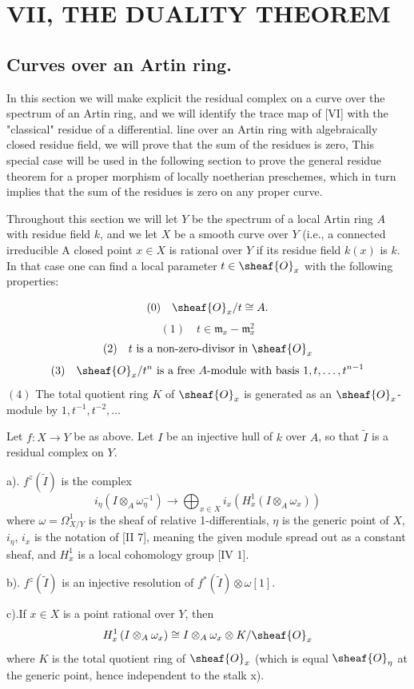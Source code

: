 \documentclass[12pt]{book}
\begin{document}
\setcounter{page}{357}
\chapter{VII, THE DUALITY THEOREM}

\section{Curves over an Artin ring.}

In this section we will make explicit the residual complex on a curve over the spectrum of an Artin ring, and we will identify the trace map of [VI] with the "classical" residue of a differential.
line over an Artin ring with algebraically closed residue field, we will prove that the sum of the residues is zero, This special case will be used in the following section to prove the general residue theorem for a proper morphism of locally noetherian preschemes, which in turn implies that the sum of the residues is zero on any proper curve.

Throughout this section we will let \(Y\) be the spectrum of a local Artin ring \(A\) with residue field \(k\), and we let \(X\) be a smooth curve over \(Y\) (i.e., a connected irreducible A closed point \(x \in X\) is rational over \(Y\) if its residue field \(k(x)\) is \(k\).
In that case one can find a local parameter \(t \in \sheaf{O}_{x}\) with the following properties:

\setcounter{page}{358}
\[
(0)\quad \sheaf{O}_{x} / t \cong A.
\]
\[
(1)\quad t \in \mathfrak{m}_{x}-\mathfrak{m}_{x}^{2}
\]
\[
(2)\quad t \text{ is a non-zero-divisor in } \sheaf{O}_{x}
\]
\[
(3)\quad \sheaf{O}_{x} / t^{n} \text{ is a free } A\text{-module with basis } 1, t, \dots, t^{n-1}
\]
\((4)\) The total quotient ring \(K\) of \(\sheaf{O}_{x}\) is generated as an \(\sheaf{O}_{x}\)-module by \(1, t^{-1}, t^{-2}, \dots\)

\begin{proposition}
Let \(f: X \to Y\) be as above.
Let \(I\) be an injective hull of \(k\) over \(A\), so that \(\tilde{I}\) is a residual complex on \(Y\).

a). \(f^{z}(\tilde{I})\) is the complex
\[
i_{\eta}\left(I \otimes_{A} \omega_{\eta}^{-1}\right) \to \bigoplus_{x \in X} i_{x}\left(H_{x}^{1}\left(I \otimes_{A} \omega_{x}\right)\right)
\]
where \(\omega=\Omega_{X/Y}^{1}\) is the sheaf of relative 1-differentials, \(\eta\) is the generic point of \(X\), \(i_{\eta}\), \(i_{x}\) is the notation of [II 7], meaning the given module spread out as a constant sheaf, and \(H_{x}^{1}\) is a local cohomology group [IV 1].

\setcounter{page}{359}
b). \(f^{z}(\tilde{I})\) is an injective resolution of \(f^{*}(\tilde{I}) \otimes \omega[1]\).

c).If \(x \in X\) is a point rational over \(Y\), then
\[
H_{x}^{1}\left(I \otimes_{A} \omega_{x}\right) \cong I \otimes_{A} \omega_{x} \otimes K / \sheaf{O}_{x}
\]
where \(K\) is the total quotient ring of \(\sheaf{O}_{x}\) (which is equal \(\sheaf{O}_{\eta}\) at the generic point, hence independent to the stalk x).
\end{proposition}
\end{document}
